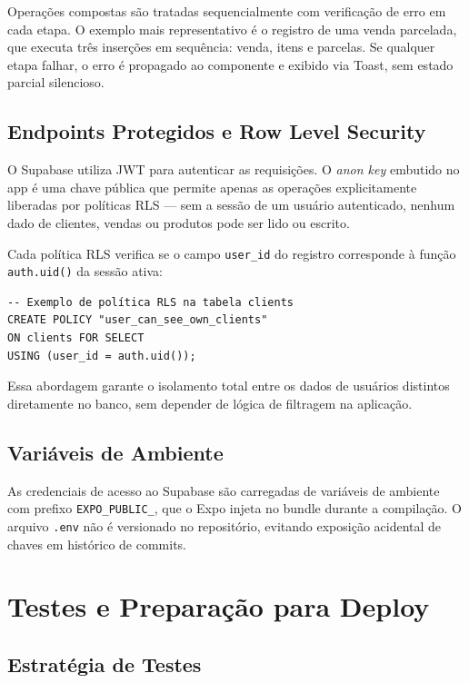 \documentclass[
	12pt,				%
	oneside,			%
	a4paper,			%
	english,			%
	brazil				%
	]{abntex2}
\begin{document}
Operações compostas são tratadas sequencialmente com verificação de erro em cada etapa. O exemplo mais representativo é o registro de uma venda parcelada, que executa três inserções em sequência: venda, itens e parcelas. Se qualquer etapa falhar, o erro é propagado ao componente e exibido via Toast, sem estado parcial silencioso.

\section{Endpoints Protegidos e Row Level Security}

O Supabase utiliza JWT para autenticar as requisições. O \textit{anon key} embutido no app é uma chave pública que permite apenas as operações explicitamente liberadas por políticas RLS — sem a sessão de um usuário autenticado, nenhum dado de clientes, vendas ou produtos pode ser lido ou escrito.

Cada política RLS verifica se o campo \texttt{user\_id} do registro corresponde à função \texttt{auth.uid()} da sessão ativa:

\begin{verbatim}
-- Exemplo de política RLS na tabela clients
CREATE POLICY "user_can_see_own_clients"
ON clients FOR SELECT
USING (user_id = auth.uid());
\end{verbatim}

Essa abordagem garante o isolamento total entre os dados de usuários distintos diretamente no banco, sem depender de lógica de filtragem na aplicação.

\section{Variáveis de Ambiente}

As credenciais de acesso ao Supabase são carregadas de variáveis de ambiente com prefixo \texttt{EXPO\_PUBLIC\_}, que o Expo injeta no bundle durante a compilação. O arquivo \texttt{.env} não é versionado no repositório, evitando exposição acidental de chaves em histórico de commits.

\chapter{Testes e Preparação para Deploy}

\section{Estratégia de Testes}
\end{document}
